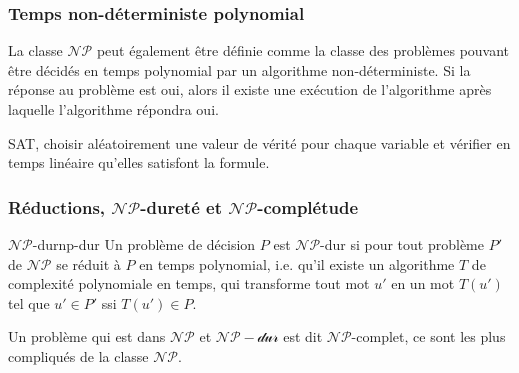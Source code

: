 \subsubsection{Temps non-déterministe polynomial}
\label{sub:temps_non_deterministe_polynomial}
La classe $\mathcal{NP}$ peut également être définie comme la classe des problèmes pouvant être décidés en temps polynomial
par un algorithme non-déterministe. Si la réponse au problème est oui, alors il existe une exécution de l'algorithme après 
laquelle l'algorithme répondra oui.
\begin{example}
    SAT, choisir aléatoirement une valeur de vérité pour chaque variable et vérifier en temps linéaire qu'elles satisfont
    la formule.
\end{example}

\subsubsection{Réductions, $\mathcal{NP}$-dureté et $\mathcal{NP}$-complétude}
\label{sub:reductions_np_durete_et_np_completude}
\begin{definition}{$\mathcal{NP}$-dur}{np-dur}
    Un problème de décision $P$ est $\mathcal{NP}$-dur si pour tout problème $P'$ de $\mathcal{NP}$ se réduit à $P$ en temps
    polynomial, i.e. qu'il existe un algorithme $T$ de complexité polynomiale en temps, qui transforme tout mot $u'$ en un 
    mot $T(u')$ tel que $u'\in P'$ ssi $T(u')\in P$.
\end{definition}
Un problème qui est dans $\mathcal{NP}$ et $\mathcal{NP-dur}$ est dit $\mathcal{NP}$-complet, ce sont les plus compliqués de
la classe $\mathcal{NP}$.

